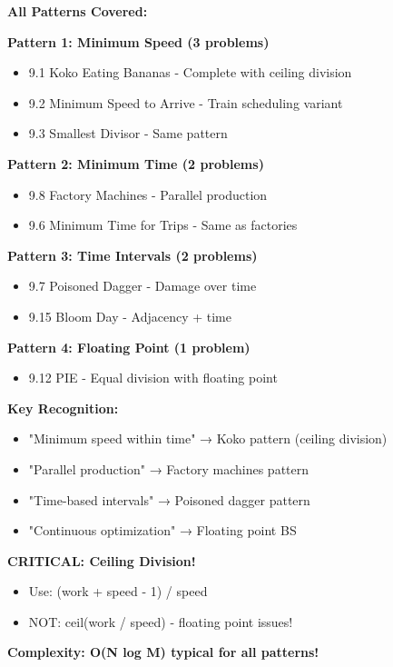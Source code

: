 \documentclass[11pt,a4paper,oneside]{book}
\begin{document}
\begin{tcolorbox}[
    enhanced,breakable,
    colback=primaryblue!10,
    colframe=primaryblue,
    boxrule=2pt,
    arc=4mm,
    title=\textbf{Speed and Time Problems: Complete Mastery}
]
\textbf{All Patterns Covered:}

\textbf{Pattern 1: Minimum Speed (3 problems)}
\begin{itemize}
\item 9.1 Koko Eating Bananas - Complete with ceiling division
\item 9.2 Minimum Speed to Arrive - Train scheduling variant
\item 9.3 Smallest Divisor - Same pattern
\end{itemize}

\textbf{Pattern 2: Minimum Time (2 problems)}
\begin{itemize}
\item 9.8 Factory Machines - Parallel production
\item 9.6 Minimum Time for Trips - Same as factories
\end{itemize}

\textbf{Pattern 3: Time Intervals (2 problems)}
\begin{itemize}
\item 9.7 Poisoned Dagger - Damage over time
\item 9.15 Bloom Day - Adjacency + time
\end{itemize}

\textbf{Pattern 4: Floating Point (1 problem)}
\begin{itemize}
\item 9.12 PIE - Equal division with floating point
\end{itemize}

\textbf{Key Recognition:}
\begin{itemize}
\item "Minimum speed within time" → Koko pattern (ceiling division)
\item "Parallel production" → Factory machines pattern
\item "Time-based intervals" → Poisoned dagger pattern
\item "Continuous optimization" → Floating point BS
\end{itemize}

\textbf{CRITICAL: Ceiling Division!}
\begin{itemize}
\item Use: (work + speed - 1) / speed
\item NOT: ceil(work / speed) - floating point issues!
\end{itemize}

\textbf{Complexity: O(N log M) typical for all patterns!}
\end{tcolorbox}
\end{document}
